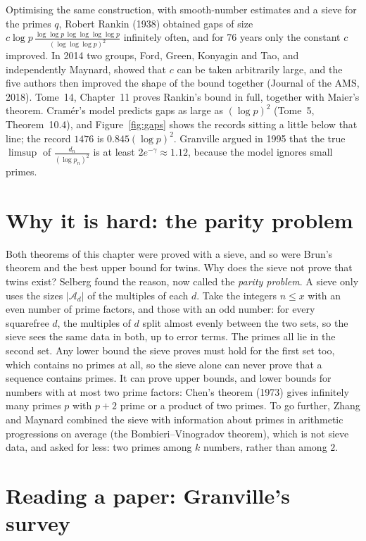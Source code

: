 \begin{remark}
Optimising the same construction, with smooth-number estimates and a sieve for the primes $q$, Robert Rankin (1938) obtained gaps of size
$c\log p\,\frac{\log\log p\,\log\log\log\log p}{(\log\log\log p)^2}$ infinitely often, and for 76 years only the constant $c$ improved. In 2014 two groups,
Ford, Green, Konyagin and Tao, and independently Maynard, showed that $c$ can be taken arbitrarily large, and the five authors then improved the
shape of the bound together (Journal of the AMS, 2018). Tome~14, Chapter~11 proves Rankin's bound in full, together with Maier's theorem. Cram\'er's model predicts gaps as large as $(\log p)^2$ (Tome~5, Theorem~10.4), and
Figure~\ref{fig:gaps} shows the records sitting a little below that line; the record $1476$ is $0.845(\log p)^2$. Granville argued in 1995 that the
true $\limsup$ of $\frac{d_n}{(\log p_n)^2}$ is at least $2e^{-\gamma}\approx1.12$, because the model ignores small primes.
\end{remark}

\section{Why it is hard: the parity problem}

Both theorems of this chapter were proved with a sieve, and so were Brun's theorem and the best upper bound for twins. Why does the sieve not prove
that twins exist? Selberg found the reason, now called the \emph{parity problem}. A sieve only uses the sizes $|\mathcal A_d|$ of the multiples of each
$d$. Take the integers $n\le x$ with an even number of prime factors, and those with an odd number: for every squarefree $d$, the multiples of $d$ split
almost evenly between the two sets, so the sieve sees the same data in both, up to error terms. The primes all lie in the second set. Any lower bound
the sieve proves must hold for the first set too, which contains no primes at all, so the sieve alone can never prove that a sequence contains primes.
It can prove upper bounds, and lower bounds for numbers with at most two prime factors: Chen's theorem (1973) gives infinitely many primes $p$ with
$p+2$ prime or a product of two primes. To go further, Zhang and Maynard combined the sieve with information about primes in arithmetic progressions
on average (the Bombieri--\allowbreak Vinogradov theorem), which is not sieve data, and asked for less: two primes among $k$ numbers, rather than among $2$.

\section{Reading a paper: Granville's survey}

